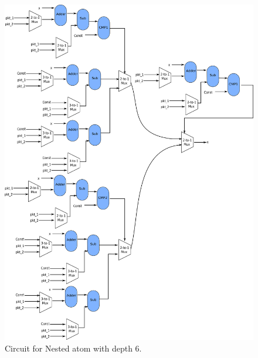 \newpage
\begin{figure}[!htbp]
  \includegraphics[width=\textwidth]{nested.pdf}
  \caption{Circuit for Nested atom with depth 6.}
  \label{fig:sub}
\end{figure}

\FloatBarrier


